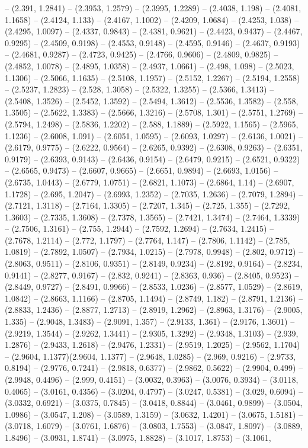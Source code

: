 -- (2.391, 1.2841) -- (2.3953, 1.2579) -- (2.3995, 1.2289) -- (2.4038, 1.198) -- (2.4081, 1.1658) -- (2.4124, 1.133) -- (2.4167, 1.1002) -- (2.4209, 1.0684) -- (2.4253, 1.038) -- (2.4295, 1.0097) -- (2.4337, 0.9843) -- (2.4381, 0.9621) -- (2.4423, 0.9437) -- (2.4467, 0.9295) -- (2.4509, 0.9198) -- (2.4553, 0.9148) -- (2.4595, 0.9146) -- (2.4637, 0.9193) -- (2.4681, 0.9287) -- (2.4723, 0.9425) -- (2.4766, 0.9606) -- (2.4809, 0.9825) -- (2.4852, 1.0078) -- (2.4895, 1.0358) -- (2.4937, 1.0661) -- (2.498, 1.098) -- (2.5023, 1.1306) -- (2.5066, 1.1635) -- (2.5108, 1.1957) -- (2.5152, 1.2267) -- (2.5194, 1.2558) -- (2.5237, 1.2823) -- (2.528, 1.3058) -- (2.5322, 1.3255) -- (2.5366, 1.3413) -- (2.5408, 1.3526) -- (2.5452, 1.3592) -- (2.5494, 1.3612) -- (2.5536, 1.3582) -- (2.558, 1.3505) -- (2.5622, 1.3383) -- (2.5666, 1.3216) -- (2.5708, 1.301) -- (2.5751, 1.2769) -- (2.5794, 1.2498) -- (2.5836, 1.2202) -- (2.588, 1.1889) -- (2.5922, 1.1565) -- (2.5965, 1.1236) -- (2.6008, 1.091) -- (2.6051, 1.0595) -- (2.6093, 1.0297) -- (2.6136, 1.0021) -- (2.6179, 0.9775) -- (2.6222, 0.9564) -- (2.6265, 0.9392) -- (2.6308, 0.9263) -- (2.6351, 0.9179) -- (2.6393, 0.9143) -- (2.6436, 0.9154) -- (2.6479, 0.9215) -- (2.6521, 0.9322) -- (2.6565, 0.9473) -- (2.6607, 0.9665) -- (2.6651, 0.9894) -- (2.6693, 1.0156) -- (2.6735, 1.0443) -- (2.6779, 1.0751) -- (2.6821, 1.1073) -- (2.6864, 1.14) -- (2.6907, 1.1728) -- (2.695, 1.2047) -- (2.6993, 1.2352) -- (2.7035, 1.2636) -- (2.7079, 1.2894) -- (2.7121, 1.3118) -- (2.7164, 1.3305) -- (2.7207, 1.345) -- (2.725, 1.355) -- (2.7292, 1.3603) -- (2.7335, 1.3608) -- (2.7378, 1.3565) -- (2.7421, 1.3474) -- (2.7464, 1.3339) -- (2.7506, 1.3161) -- (2.755, 1.2944) -- (2.7592, 1.2694) -- (2.7634, 1.2415) -- (2.7678, 1.2114) -- (2.772, 1.1797) -- (2.7764, 1.147) -- (2.7806, 1.1142) -- (2.785, 1.0819) -- (2.7892, 1.0507) -- (2.7934, 1.0215) -- (2.7978, 0.9948) -- (2.802, 0.9712) -- (2.8063, 0.9511) -- (2.8106, 0.9351) -- (2.8149, 0.9234) -- (2.8192, 0.9164) -- (2.8234, 0.9141) -- (2.8277, 0.9167) -- (2.832, 0.9241) -- (2.8363, 0.936) -- (2.8405, 0.9523) -- (2.8449, 0.9727) -- (2.8491, 0.9966) -- (2.8533, 1.0236) -- (2.8577, 1.0529) -- (2.8619, 1.0842) -- (2.8663, 1.1166) -- (2.8705, 1.1494) -- (2.8749, 1.182) -- (2.8791, 1.2136) -- (2.8833, 1.2436) -- (2.8877, 1.2713) -- (2.8919, 1.2962) -- (2.8963, 1.3176) -- (2.9005, 1.335) -- (2.9048, 1.3483) -- (2.9091, 1.357) -- (2.9133, 1.361) -- (2.9176, 1.3601) -- (2.9219, 1.3544) -- (2.9262, 1.3441) -- (2.9305, 1.3292) -- (2.9348, 1.3103) -- (2.939, 1.2876) -- (2.9433, 1.2618) -- (2.9476, 1.2331) -- (2.9519, 1.2025) -- (2.9562, 1.1704) -- (2.9604, 1.1377)(2.9604, 1.1377) -- (2.9648, 1.0285) -- (2.969, 0.9216) -- (2.9733, 0.8194) -- (2.9776, 0.7241) -- (2.9818, 0.6377) -- (2.9862, 0.5622) -- (2.9904, 0.499) -- (2.9948, 0.4496) -- (2.999, 0.4151) -- (3.0032, 0.3963) -- (3.0076, 0.3934) -- (3.0118, 0.4065) -- (3.0161, 0.4356) -- (3.0204, 0.4797) -- (3.0247, 0.5381) -- (3.029, 0.6094) -- (3.0332, 0.6921) -- (3.0375, 0.7845) -- (3.0418, 0.8844) -- (3.0461, 0.9899) -- (3.0504, 1.0986) -- (3.0547, 1.208) -- (3.0589, 1.3159) -- (3.0632, 1.4201) -- (3.0675, 1.5181) -- (3.0718, 1.6079) -- (3.0761, 1.6876) -- (3.0803, 1.7553) -- (3.0847, 1.8097) -- (3.0889, 1.8496) -- (3.0931, 1.8741) -- (3.0975, 1.8828) -- (3.1017, 1.8753) -- (3.1061, 